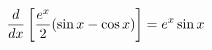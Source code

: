 \documentclass[preview]{standalone}
\begin{document}
\begin{align*}
\special{dvisvgm:raw <g id='unique000'>}\frac{d}{dx}\left[\frac{e^x}{2}(\sin x - \cos x)\right] = e^x \sin x\special{dvisvgm:raw </g>}
\end{align*}
\end{document}

